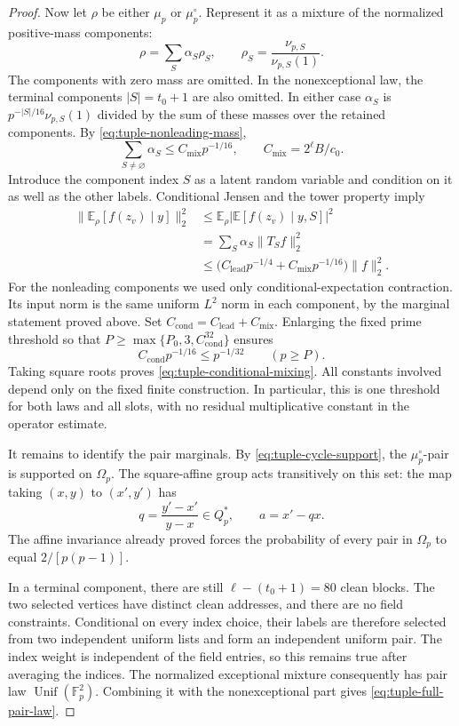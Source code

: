 \begin{proof}
Now let \(\rho\) be either \(\mu_p\) or \(\mu_p^\circ\).
Represent it as a mixture of the normalized positive-mass components:
\[
 \rho=\sum_S\alpha_S\rho_S,\qquad
 \rho_S=\frac{\nu_{p,S}}{\nu_{p,S}(1)}.
\]
The components with zero mass are omitted.  In the nonexceptional law,
the terminal components \(|S|=t_0+1\) are also omitted.  In either
case \(\alpha_S\) is \(p^{-|S|/16}\nu_{p,S}(1)\) divided by the
sum of these masses over the retained components. By
\eqref{eq:tuple-nonleading-mass},
\begin{equation}
 \sum_{S\ne\varnothing}\alpha_S
 \le C_{\mathrm{mix}}p^{-1/16},
 \qquad C_{\mathrm{mix}}=2^\ell B/c_0.
 \label{eq:conditional-mixture-mass}
\end{equation}
Introduce the component index \(S\) as a latent random variable and
condition on it as well as the other labels.  Conditional Jensen and
the tower property imply
\begin{align*}
 \bigl\|\mathbb E_\rho[f(z_v)\mid y]\bigr\|_2^2
 &\le\mathbb E_\rho
       \bigl|\mathbb E[f(z_v)\mid y,S]\bigr|^2\\
 &=\sum_S\alpha_S\|T_Sf\|_2^2\\
 &\le\bigl(C_{\mathrm{lead}}p^{-1/4}
             +C_{\mathrm{mix}}p^{-1/16}\bigr)\|f\|_2^2.
\end{align*}
For the nonleading components we used only conditional-expectation
contraction.  Its input norm is the same uniform \(L^2\) norm in each
component, by the marginal statement proved above.  Set
\(C_{\mathrm{cond}}=C_{\mathrm{lead}}+C_{\mathrm{mix}}\).
Enlarging the fixed prime threshold so that
\(P\ge\max\{P_0,3,C_{\mathrm{cond}}^{32}\}\) ensures
\[
 C_{\mathrm{cond}}p^{-1/16}\le p^{-1/32}
 \qquad(p\ge P).
\]
Taking square roots proves
\eqref{eq:tuple-conditional-mixing}.  All constants involved depend
only on the fixed finite construction.  In particular, this is one
threshold for both laws and all slots, with no residual multiplicative
constant in the operator estimate.

It remains to identify the pair marginals. By
\eqref{eq:tuple-cycle-support}, the \(\mu_p^\circ\)-pair is supported
on \(\Omega_p\). The square-affine group acts transitively on this
set: the map taking \((x,y)\) to \((x',y')\) has
\[
 q=\frac{y'-x'}{y-x}\in Q_p^*,\qquad a=x'-qx.
\]
The affine invariance already proved forces the probability of every
pair in \(\Omega_p\) to equal \(2/[p(p-1)]\).

In a terminal component, there are still
\(\ell-(t_0+1)=80\) clean blocks.  The two selected vertices have
distinct clean addresses, and there are no field constraints.
Conditional on every index choice, their labels are therefore selected
from two independent uniform lists and form an independent uniform
pair.  The index weight is independent of the field entries, so this
remains true after averaging the indices.  The normalized exceptional
mixture consequently has pair law
\(\operatorname{Unif}(\mathbb F_p^2)\).  Combining it with the
nonexceptional part gives \eqref{eq:tuple-full-pair-law}.
\end{proof}

